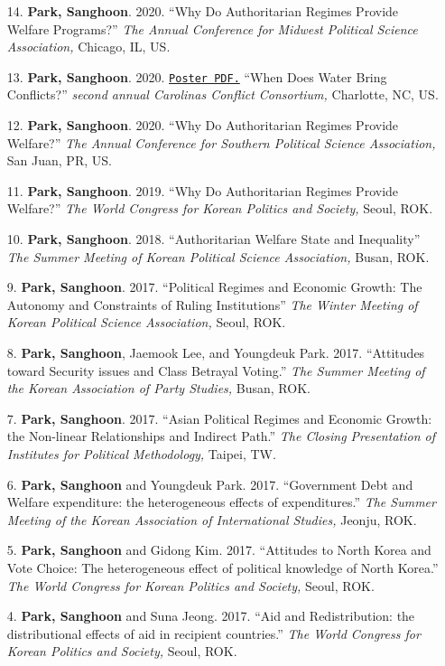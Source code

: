 \documentclass[
  16,
]{article}
\begin{document}
\begin{itemize}
  \item[14.] {\bf Park, Sanghoon}. {2020.} {``Why Do Authoritarian Regimes Provide Welfare Programs?''} {\it The Annual Conference for Midwest Political Science Association,} Chicago, IL, US.
  \item[13.] {\bf Park, Sanghoon}. {2020.} \href{https://www.dropbox.com/s/7xr90ielm1vh1sd/poster.pdf?dl=0}{\tt Poster PDF.} {``When Does Water Bring Conflicts?''} {\it second annual Carolinas Conflict Consortium,} Charlotte, NC, US.
  \item[12.] {\bf Park, Sanghoon}. {2020.} {``Why Do Authoritarian Regimes Provide Welfare?''} {\it The Annual Conference for Southern Political Science Association,} San Juan, PR, US.
  \item[11.] {\bf Park, Sanghoon}. {2019.} {``Why Do Authoritarian Regimes Provide Welfare?''} {\it The World Congress for Korean Politics and Society,} Seoul, ROK.
  \item[10.] {\bf Park, Sanghoon}. {2018.} {``Authoritarian Welfare State and Inequality''} {\it The Summer Meeting of Korean Political Science Association,} Busan, ROK.
  \item[9.] {\bf Park, Sanghoon}. {2017.} {``Political Regimes and Economic Growth: The Autonomy and Constraints of Ruling Institutions''} {\it The Winter Meeting of Korean Political Science Association,} Seoul, ROK.
  \item[8.] {\bf Park, Sanghoon}, Jaemook Lee, and Youngdeuk Park. {2017.} {``Attitudes toward Security issues and Class Betrayal Voting.''} {\it The Summer Meeting of the Korean Association of Party Studies,} Busan, ROK.
  \item[7.] {\bf Park, Sanghoon}. {2017.} {``Asian Political Regimes and Economic Growth: the Non-linear Relationships and Indirect Path.''} {\it The Closing Presentation of Institutes for Political Methodology,} Taipei, TW.
  \item[6.] {\bf Park, Sanghoon} and Youngdeuk Park. {2017.} {``Government Debt and Welfare expenditure: the heterogeneous effects of expenditures.''} {\it The Summer Meeting of the Korean Association of International Studies,} Jeonju, ROK.
  \item[5.] {\bf Park, Sanghoon} and Gidong Kim. {2017.} {``Attitudes to North Korea and Vote Choice: The heterogeneous effect of political knowledge of North Korea.''} {\it The World Congress for Korean Politics and Society,} Seoul, ROK.
  \item[4.] {\bf Park, Sanghoon} and Suna Jeong. {2017.} {``Aid and Redistribution: the distributional effects of aid in recipient countries.''} {\it The World Congress for Korean Politics and Society,} Seoul, ROK.

\end{itemize}
\end{document}
